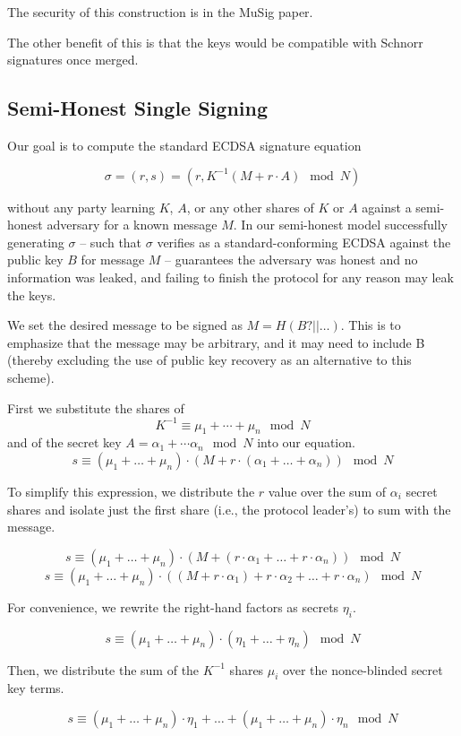 \documentclass{article}
\begin{document}
The security of this construction is in the MuSig paper.

The other benefit of this is that the keys would be compatible with Schnorr signatures once merged.

\subsection{Semi-Honest Single Signing}

Our goal is to compute the standard ECDSA signature equation

$$\sigma = (r,s) = (r, K^{-1} ( M + r\cdot A) \mod N) $$

without any party learning $K$, $A$, or any other shares of $K$ or $A$ against a semi-honest adversary for a known message $M$. In our semi-honest model successfully generating $\sigma$ -- such that $\sigma$ verifies as a standard-conforming ECDSA against the public key $B$ for message $M$ -- guarantees the adversary was honest and no information was leaked, and failing to finish the protocol for any reason may leak the keys. 


We set the desired message to be signed as $M=H(B? || \ldots)$. This is to
emphasize that the message may be arbitrary, and it may need to include B (thereby
excluding the use of public key recovery as an alternative to this scheme).


First we substitute the shares of $$K^{-1} \equiv \mu_1 + \cdots + \mu_n \mod N$$ and of the secret key $A = \alpha_1 + \cdots \alpha_n \mod N$ into our equation. 
$$s \equiv (\mu_1 + \ldots + \mu_n)\cdot(M + r\cdot(\alpha_1 + \ldots + \alpha_n)) \mod N$$

To simplify this expression, we distribute the $r$ value over the sum of $\alpha_i$ secret shares and isolate just the first share (i.e., the protocol leader's) to sum with the message.

$$s \equiv (\mu_1 + \ldots + \mu_n)\cdot(M + (r \cdot \alpha_1 + \ldots + r \cdot\alpha_n)) \mod N$$
$$s \equiv (\mu_1 + \ldots + \mu_n)\cdot((M + r \cdot \alpha_1) + r \cdot \alpha_2 + \ldots + r \cdot\alpha_n) \mod N$$

For convenience, we rewrite the right-hand factors as secrets $\eta_i$.

$$s \equiv (\mu_1 + \ldots + \mu_n)\cdot(\eta_1 + \ldots + \eta_n) \mod N$$


Then, we distribute the sum of the $K^{-1}$ shares $\mu_i$ over the nonce-blinded secret key terms.

$$s \equiv (\mu_1 + \ldots + \mu_n)\cdot \eta_1 + \ldots + (\mu_1 + \ldots + \mu_n)\cdot \eta_n \mod N$$
\end{document}
